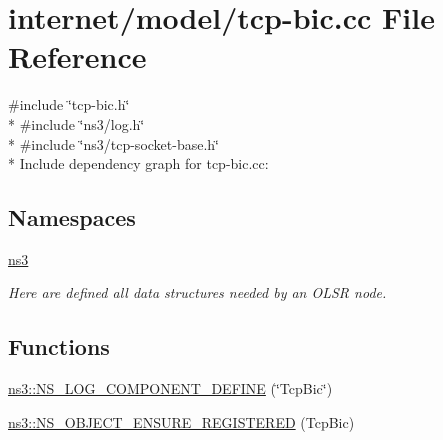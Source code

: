 \hypertarget{tcp-bic_8cc}{}\section{internet/model/tcp-\/bic.cc File Reference}
\label{tcp-bic_8cc}
{\ttfamily \#include \char`\"{}tcp-\/bic.\+h\char`\"{}}\\*
{\ttfamily \#include \char`\"{}ns3/log.\+h\char`\"{}}\\*
{\ttfamily \#include \char`\"{}ns3/tcp-\/socket-\/base.\+h\char`\"{}}\\*
Include dependency graph for tcp-\/bic.cc\+:
\subsection*{Namespaces}
\begin{DoxyCompactItemize}
\item 
 \hyperlink{namespacens3}{ns3}
\begin{DoxyCompactList}\small\item\em Here are defined all data structures needed by an O\+L\+SR node. \end{DoxyCompactList}\end{DoxyCompactItemize}
\subsection*{Functions}
\begin{DoxyCompactItemize}
\item 
\hyperlink{namespacens3_a51e193b7441ec78b5e83c05ec7a8e988}{ns3\+::\+N\+S\+\_\+\+L\+O\+G\+\_\+\+C\+O\+M\+P\+O\+N\+E\+N\+T\+\_\+\+D\+E\+F\+I\+NE} (\char`\"{}Tcp\+Bic\char`\"{})
\item 
\hyperlink{namespacens3_adf073679f23c92c0814d9b0acb4c0b96}{ns3\+::\+N\+S\+\_\+\+O\+B\+J\+E\+C\+T\+\_\+\+E\+N\+S\+U\+R\+E\+\_\+\+R\+E\+G\+I\+S\+T\+E\+R\+ED} (Tcp\+Bic)
\end{DoxyCompactItemize}
